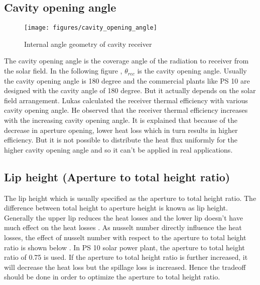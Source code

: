 \subsection{Cavity opening angle}
\begin{figure}[h]
	\texttt{[image: figures/cavity\_opening\_angle]}
	\centering
	\caption{Internal angle geometry of cavity receiver}	
\end{figure}
The cavity opening angle is the coverage angle of the radiation to receiver from the solar field. In the following figure \cite{Feierabend.2010}, $ \theta_{rec} $ is the cavity opening angle. Usually the cavity opening angle is 180 degree and the commercial plants like PS 10 are designed with the cavity angle of 180 degree. But it actually depends on the solar field arrangement. Lukas calculated the receiver thermal efficiency with various cavity opening angle. He observed that the receiver thermal efficiency increases with the increasing cavity opening angle. It is explained that because of the decrease in aperture opening, lower heat loss which in turn results in higher efficiency. But it is not possible to distribute the heat flux uniformly for the higher cavity opening angle and so it can't be applied in real applications.

\subsection{Lip height (Aperture to total height ratio) } 
The lip height which is usually specified as the aperture to total height ratio. The difference between total height to aperture height is known as lip height. Generally the upper lip reduces the heat losses and the lower lip doesn't have much effect on the heat losses \cite{Kraabel.1983}. As nusselt number directly influence the heat losses, the effect of nusselt number with respect to the aperture to total height ratio is shown below \cite{Feierabend.2010}. In PS 10 solar power plant, the aperture to total height ratio of 0.75 is used. If the aperture to total height ratio is further increased, it will decrease the heat loss but the spillage loss is increased. Hence the tradeoff should be done in order to optimize the aperture to total height ratio. 

